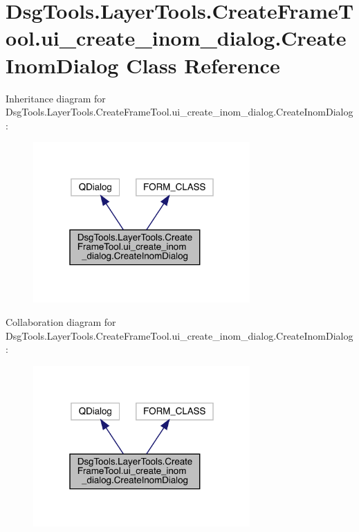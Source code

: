\hypertarget{class_dsg_tools_1_1_layer_tools_1_1_create_frame_tool_1_1ui__create__inom__dialog_1_1_create_inom_dialog}{}\section{Dsg\+Tools.\+Layer\+Tools.\+Create\+Frame\+Tool.\+ui\+\_\+create\+\_\+inom\+\_\+dialog.\+Create\+Inom\+Dialog Class Reference}
\label{class_dsg_tools_1_1_layer_tools_1_1_create_frame_tool_1_1ui__create__inom__dialog_1_1_create_inom_dialog}


Inheritance diagram for Dsg\+Tools.\+Layer\+Tools.\+Create\+Frame\+Tool.\+ui\+\_\+create\+\_\+inom\+\_\+dialog.\+Create\+Inom\+Dialog\+:
\nopagebreak
\begin{figure}[H]
\begin{center}
\leavevmode
\includegraphics[width=235pt]{class_dsg_tools_1_1_layer_tools_1_1_create_frame_tool_1_1ui__create__inom__dialog_1_1_create_inom_dialog__inherit__graph}
\end{center}
\end{figure}


Collaboration diagram for Dsg\+Tools.\+Layer\+Tools.\+Create\+Frame\+Tool.\+ui\+\_\+create\+\_\+inom\+\_\+dialog.\+Create\+Inom\+Dialog\+:
\nopagebreak
\begin{figure}[H]
\begin{center}
\leavevmode
\includegraphics[width=235pt]{class_dsg_tools_1_1_layer_tools_1_1_create_frame_tool_1_1ui__create__inom__dialog_1_1_create_inom_dialog__coll__graph}
\end{center}
\end{figure}
